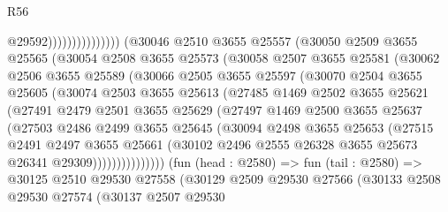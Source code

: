 \begin{lexlean}{R56}
\begin{coremodule}
                                      @29592)))))))))))))))
        (@30046
          @2510
          @3655
          @25557
          (@30050
            @2509
            @3655
            @25565
            (@30054
              @2508
              @3655
              @25573
              (@30058
                @2507
                @3655
                @25581
                (@30062
                  @2506
                  @3655
                  @25589
                  (@30066
                    @2505
                    @3655
                    @25597
                    (@30070
                      @2504
                      @3655
                      @25605
                      (@30074
                        @2503
                        @3655
                        @25613
                        (@27485
                          @1469
                          @2502
                          @3655
                          @25621
                          (@27491
                            @2479
                            @2501
                            @3655
                            @25629
                            (@27497
                              @1469
                              @2500
                              @3655
                              @25637
                              (@27503
                                @2486
                                @2499
                                @3655
                                @25645
                                (@30094
                                  @2498
                                  @3655
                                  @25653
                                  (@27515
                                    @2491
                                    @2497
                                    @3655
                                    @25661
                                    (@30102
                                      @2496
                                      @2555
                                      @26328
                                      @3655
                                      @25673
                                      @26341
                                      @29309)))))))))))))))
        (fun (head : @2580) =>
        fun (tail : @2580) =>
        @30125
          @2510
          @29530
          @27558
          (@30129
            @2509
            @29530
            @27566
            (@30133
              @2508
              @29530
              @27574
              (@30137
                @2507
                @29530

\end{coremodule}
\end{lexlean}
